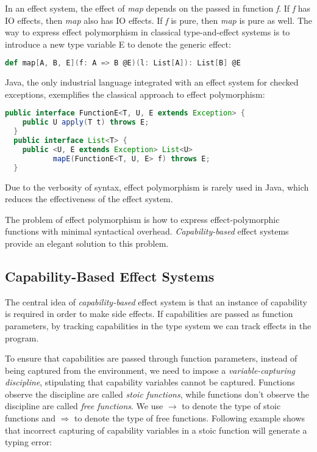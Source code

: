 In an effect system, the effect of \emph{map} depends on the passed in
function \emph{f}. If \emph{f} has IO effects, then \emph{map} also
has IO effects. If \emph{f} is pure, then \emph{map} is pure as
well. The way to express effect polymorphism in classical
type-and-effect systems is to introduce a new type variable E to
denote the generic effect:

\begin{lstlisting}[language=Scala]
def map[A, B, E](f: A => B @E)(l: List[A]): List[B] @E
\end{lstlisting}

Java, the only industrial language integrated with an effect system
for checked exceptions, exemplifies the classical approach to effect
polymorphism:

\begin{lstlisting}[language=Java]
  public interface FunctionE<T, U, E extends Exception> {
    public U apply(T t) throws E;
  }
  public interface List<T> {
    public <U, E extends Exception> List<U>
           mapE(FunctionE<T, U, E> f) throws E;
  }
\end{lstlisting}

Due to the verbosity of syntax, effect polymorphism is rarely used in
Java, which reduces the effectiveness of the effect system.

The problem of effect polymorphism is how to express
effect-polymorphic functions with minimal syntactical overhead.
\emph{Capability-based} effect systems provide an elegant solution to
this problem.

\subsection{Capability-Based Effect Systems}

The central idea of \emph{capability-based} effect system is that an
instance of capability is required in order to make side effects. If
capabilities are passed as function parameters, by tracking
capabilities in the type system we can track effects in the program.

To ensure that capabilities are passed through function parameters,
instead of being captured from the environment, we need to impose a
\emph{variable-capturing discipline}, stipulating that capability
variables cannot be captured. Functions observe the discipline are
called \emph{stoic functions}, while functions don't observe the
discipline are called \emph{free functions}. We use $\to$ to denote
the type of stoic functions and $\Rightarrow$ to denote the type of
free functions. Following example shows that incorrect capturing of
capability variables in a stoic function will generate a typing error:

